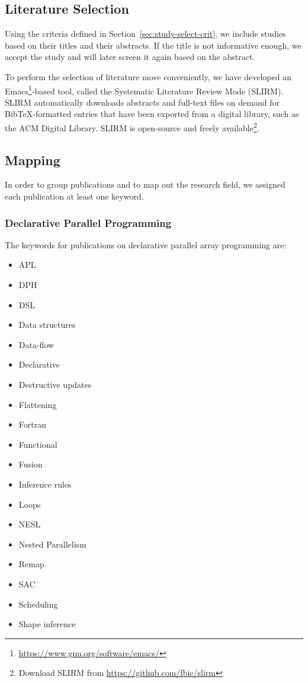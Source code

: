 \documentclass[a4paper]{article}
\begin{document}
\subsection{Literature Selection}
\label{sec:literature-selection}

Using the criteria defined in Section~\ref{sec:study-select-crit}, we
include studies based on their titles and their abstracts. If the
title is not informative enough, we accept the study and will later
screen it again based on the abstract.

To perform the selection of literature move conveniently, we have
developed an
Emacs\footnote{\url{https://www.gnu.org/software/emacs/}}-based tool,
called the Systematic Literature Review Mode (SLIRM). SLIRM
automatically downloads abstracts and full-text files on demand for
BibTeX-formatted entries that have been exported from a digital
library, such as the ACM Digital Library. SLIRM is open-source and
freely available\footnote{Download SLIRM from
  \url{https://github.com/fbie/slirm}}.

\subsection{Mapping}
\label{sec:mapping}

In order to group publications and to map out the research field, we
assigned each publication at least one keyword.

\subsubsection{Declarative Parallel Programming}

The keywords for publications on declarative parallel array
programming are:

\begin{multicols}{2}

\begin{itemize}
\item APL
\item DPH
\item DSL
\item Data structures
\item Data-flow
\item Declarative
\item Destructive updates
\item Flattening
\item Fortran
\item Functional
\item Fusion
\item Inference rules
\item Loops
\item NESL
\item Nested Parallelism
\item Remap
\item SAC
\item Scheduling
\item Shape inference
\end{itemize}

\end{multicols}
\end{document}
